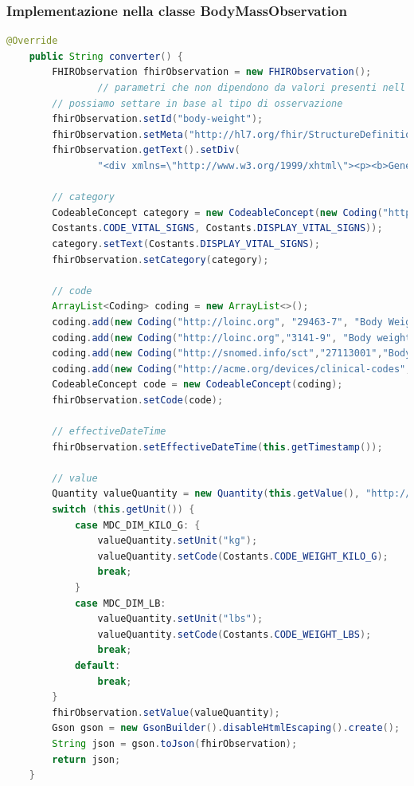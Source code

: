 \documentclass[a4paper]{article}
\begin{document}
\subsubsection*{Implementazione nella classe BodyMassObservation}
\begin{lstlisting}[language = Java, caption = metodo converter per la classe BodyMassObservation]
    @Override
    public String converter() {
        FHIRObservation fhirObservation = new FHIRObservation();
                // parametri che non dipendono da valori presenti nell'osservazione ACOM, ma che
        // possiamo settare in base al tipo di osservazione
        fhirObservation.setId("body-weight");
        fhirObservation.setMeta("http://hl7.org/fhir/StructureDefinition/vitalsigns");
        fhirObservation.getText().setDiv(
                "<div xmlns=\"http://www.w3.org/1999/xhtml\"><p><b>Generated Narrative: Observation</b><a name=\"body-weight\">");
        
        // category
        CodeableConcept category = new CodeableConcept(new Coding("http://terminology.hl7.org/CodeSystem/observation-category",
        Costants.CODE_VITAL_SIGNS, Costants.DISPLAY_VITAL_SIGNS));
        category.setText(Costants.DISPLAY_VITAL_SIGNS);
        fhirObservation.setCategory(category);

        // code
        ArrayList<Coding> coding = new ArrayList<>();
        coding.add(new Coding("http://loinc.org", "29463-7", "Body Weight"));
        coding.add(new Coding("http://loinc.org","3141-9", "Body weight Measured"));
        coding.add(new Coding("http://snomed.info/sct","27113001","Body weight"));
        coding.add(new Coding("http://acme.org/devices/clinical-codes","body-weight","Body Weight"));
        CodeableConcept code = new CodeableConcept(coding);
        fhirObservation.setCode(code);
        
        // effectiveDateTime
        fhirObservation.setEffectiveDateTime(this.getTimestamp());

        // value
        Quantity valueQuantity = new Quantity(this.getValue(), "http://unitsofmeasure.org");
        switch (this.getUnit()) {
            case MDC_DIM_KILO_G: {
                valueQuantity.setUnit("kg");
                valueQuantity.setCode(Costants.CODE_WEIGHT_KILO_G);
                break;
            }
            case MDC_DIM_LB:
                valueQuantity.setUnit("lbs");
                valueQuantity.setCode(Costants.CODE_WEIGHT_LBS);
                break;
            default:
                break;
        }
        fhirObservation.setValue(valueQuantity);
        Gson gson = new GsonBuilder().disableHtmlEscaping().create();
        String json = gson.toJson(fhirObservation);
        return json;
    }

\end{lstlisting}
\end{document}
